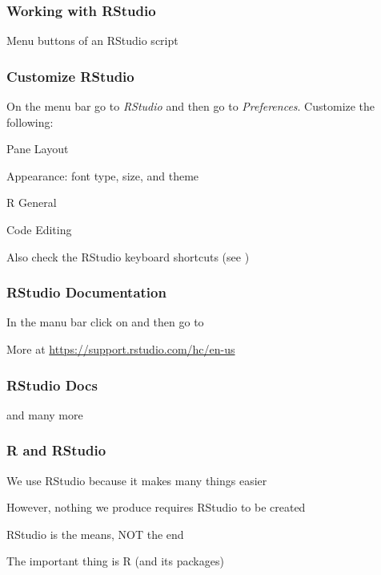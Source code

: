 \documentclass[12pt]{beamer}\usepackage[]{graphicx}\usepackage[]{color}
\begin{document}
\begin{frame}
\frametitle{Working with RStudio}
Menu buttons of an RStudio script
\begin{center}
\end{center}
\end{frame}


\begin{frame}
\frametitle{Customize RStudio}

On the menu bar go to \textit{RStudio} and then go to \textit{Preferences}. Customize the following:

\bi
  \item Pane Layout
  \item Appearance: font type, size, and theme
  \item R General
  \item Code Editing
\ei

Also check the RStudio keyboard shortcuts (see )

\end{frame}


\begin{frame}
\frametitle{RStudio Documentation}

In the manu bar click on  and then go to 
\begin{center}
\end{center}
More at \url{https://support.rstudio.com/hc/en-us}

\end{frame}


\begin{frame}
\frametitle{RStudio Docs}

\begin{center}
\end{center}
and many more 

\end{frame}


\begin{frame}
\frametitle{R and RStudio}

\bbi
  \item We use RStudio because it makes many things easier
  \item However, nothing we produce requires RStudio to be created
  \item RStudio is the means, NOT the end
  \item The important thing is R (and its packages)
\ei

\end{frame}
\end{document}
